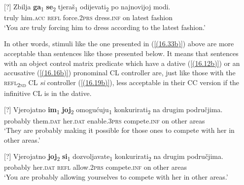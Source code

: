 \begin{exe}[?]{
\gll Zbilja \textbf{ga}\textsubscript{1} \textbf{se}\textsubscript{2} tjeraš\textsubscript{1} odijevati\textsubscript{2} po najnovijoj modi.\\
 truly him.\textsc{acc} \textsc{refl} force.2\textsc{prs} dress.\textsc{inf} on latest fashion\\ 
\glt ‘You are truly forcing him to dress according to the latest fashion.’}
\end{exe}
 
\noindent In other words, stimuli like the one presented in (\ref{(16.33b)}) above are more acceptable than sentences like those presented below. It means that sentences with an object control matrix predicate which have a dative (\ref{(16.12b)}) or an accusative (\ref{(16.16b)}) pronominal CL controller are, just like those with the \textsc{refl\textsubscript{2nd}} CL \textit{si} controller (\ref{(16.19b)}), less acceptable in their CC version if the infinitive CL is in the dative. 
 
\begin{exe}[?]{
\gll Vjerojatno \textbf{im}\textsubscript{1} \textbf{joj}\textsubscript{2} omogućuju\textsubscript{1} konkurirati\textsubscript{2} na drugim područjima.\\
 probably them.\textsc{dat} her.\textsc{dat} enable.3\textsc{prs} compete.\textsc{inf} on other areas\\ 
\glt ‘They are probably making it possible for those ones to compete with her in other areas.’}


[?]{
\gll Vjerojatno \textbf{joj}\textsubscript{2} \textbf{si}\textsubscript{1} dozvoljavate\textsubscript{1} konkurirati\textsubscript{2} na drugim područjima.\\
 probably her.\textsc{dat} \textsc{refl} allow.2\textsc{prs} compete.\textsc{inf} on other areas\\ 
\glt ‘You are probably allowing yourselves to compete with her in other areas.’}
\hfill 
\end{exe}

